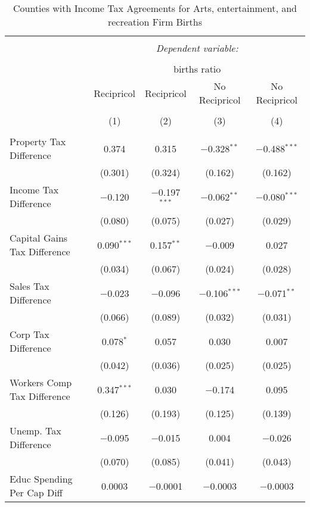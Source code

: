 
\begin{table}[!htbp] \centering 
  \caption{Counties with Income Tax Agreements for  Arts, entertainment, and recreation Firm Births} 
  \label{71agreement} 
\begin{tabular}{@{\extracolsep{5pt}}lcccc} 
\\[-1.8ex]\hline 
\hline \\[-1.8ex] 
 & \multicolumn{4}{c}{\textit{Dependent variable:}} \\ 
\cline{2-5} 
\\[-1.8ex] & \multicolumn{4}{c}{births ratio} \\ 
 & Recipricol & Recipricol & No Recipricol & No Recipricol \\ 
\\[-1.8ex] & (1) & (2) & (3) & (4)\\ 
\hline \\[-1.8ex] 
 Property Tax Difference & 0.374 & 0.315 & $-$0.328$^{**}$ & $-$0.488$^{***}$ \\ 
  & (0.301) & (0.324) & (0.162) & (0.162) \\ 
  Income Tax Difference & $-$0.120 & $-$0.197$^{***}$ & $-$0.062$^{**}$ & $-$0.080$^{***}$ \\ 
  & (0.080) & (0.075) & (0.027) & (0.029) \\ 
  Capital Gains Tax Difference & 0.090$^{***}$ & 0.157$^{**}$ & $-$0.009 & 0.027 \\ 
  & (0.034) & (0.067) & (0.024) & (0.028) \\ 
  Sales Tax Difference & $-$0.023 & $-$0.096 & $-$0.106$^{***}$ & $-$0.071$^{**}$ \\ 
  & (0.066) & (0.089) & (0.032) & (0.031) \\ 
  Corp Tax Difference & 0.078$^{*}$ & 0.057 & 0.030 & 0.007 \\ 
  & (0.042) & (0.036) & (0.025) & (0.025) \\ 
  Workers Comp Tax Difference & 0.347$^{***}$ & 0.030 & $-$0.174 & 0.095 \\ 
  & (0.126) & (0.193) & (0.125) & (0.139) \\ 
  Unemp. Tax Difference & $-$0.095 & $-$0.015 & 0.004 & $-$0.026 \\ 
  & (0.070) & (0.085) & (0.041) & (0.043) \\ 
  Educ Spending Per Cap Diff & 0.0003 & $-$0.0001 & $-$0.0003 & $-$0.0003 \\ 

\end{tabular}
\end{table}
